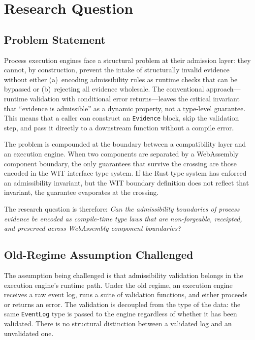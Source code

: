 
\section{Research Question}
\label{sec:sources-wasm4pm-compat-question}

\subsection{Problem Statement}
\label{sec:sources-wasm4pm-compat-question-problem}

Process execution engines face a structural problem at their admission layer: they cannot,
by construction, prevent the intake of structurally invalid evidence without either
(a)~encoding admissibility rules as runtime checks that can be bypassed or
(b)~rejecting all evidence wholesale. The conventional approach---runtime validation with
conditional error returns---leaves the critical invariant that ``evidence is admissible''
as a dynamic property, not a type-level guarantee. This means that a caller can construct
an \texttt{Evidence} block, skip the validation step, and pass it directly to a downstream
function without a compile error.

The problem is compounded at the boundary between a compatibility layer and an execution
engine. When two components are separated by a WebAssembly component boundary, the only
guarantees that survive the crossing are those encoded in the WIT interface type system.
If the Rust type system has enforced an admissibility invariant, but the WIT boundary
definition does not reflect that invariant, the guarantee evaporates at the crossing.

The research question is therefore: \emph{Can the admissibility boundaries of process
evidence be encoded as compile-time type laws that are non-forgeable, receipted, and
preserved across WebAssembly component boundaries?}

\subsection{Old-Regime Assumption Challenged}
\label{sec:sources-wasm4pm-compat-question-oldregime}

The assumption being challenged is that admissibility validation belongs in the execution
engine's runtime path. Under the old regime, an execution engine receives a raw event log,
runs a suite of validation functions, and either proceeds or returns an error. The validation
is decoupled from the type of the data: the same \texttt{EventLog} type is passed to the
engine regardless of whether it has been validated. There is no structural distinction
between a validated log and an unvalidated one.

